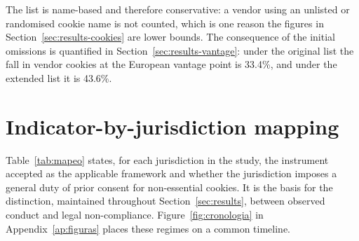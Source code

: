\documentclass[]{interact}
\begin{document}
The list is name-based and therefore conservative: a vendor using an unlisted or randomised cookie name is not counted, which is one reason the figures in Section~\ref{sec:results-cookies} are lower bounds. The consequence of the initial omissions is quantified in Section~\ref{sec:results-vantage}: under the original list the fall in vendor cookies at the European vantage point is 33.4\%, and under the extended list it is 43.6\%.

\section{Indicator-by-jurisdiction mapping}\label{ap:mapeo}
\setcounter{table}{0}\setcounter{figure}{0}

Table~\ref{tab:mapeo} states, for each jurisdiction in the study, the instrument accepted as the applicable framework and whether the jurisdiction imposes a general duty of prior consent for non-essential cookies. It is the basis for the distinction, maintained throughout Section~\ref{sec:results}, between observed conduct and legal non-compliance. Figure~\ref{fig:cronologia} in Appendix~\ref{ap:figuras} places these regimes on a common timeline.
\end{document}
